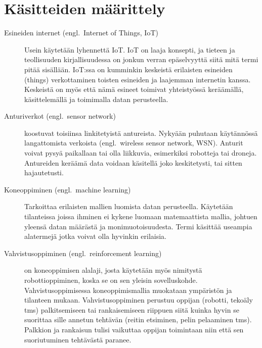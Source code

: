 \section{Käsitteiden määrittely}
\label{sec:terms}

\begin{description}

  \item [Esineiden internet (engl.\ Internet of Things, IoT)] Usein käytetään
    lyhennettä IoT. IoT on laaja konsepti, ja tieteen ja teollisuuden
    kirjallisuudessa on jonkun verran epäselvyyttä siitä mitä termi pitää
    sisällään. IoT:ssa on kumminkin keskeistä erilaisten esineiden (things)
    verkottaminen toisten esineiden ja laajemman internetin kanssa. Keskeistä
    on myös että nämä esineet toimivat yhteistyössä keräämällä, käsittelemällä
    ja toimimalla datan perusteella.~\parencite{Atzori2010a, Gubbi2013}

  \item [Anturiverkot (engl.\ sensor network)] koostuvat toisiinsa
    linkitetyistä antureista. Nykyään puhutaan käytännössä langattomista
    verkoista (engl.\ wireless sensor network, WSN).  Anturit voivat pysyä
    paikallaan tai olla liikkuvia, esimerkiksi robotteja tai droneja.
    Antureiden keräämä data voidaan käsitellä joko keskitetysti, tai sitten
    hajautetusti.~\parencite{Chong2003, Tubaishat2003}

  \item [Koneoppiminen (engl.\ machine learning)] Tarkoittaa erilaisten mallien
    luomista datan perusteella. Käytetään tilanteissa joissa ihminen ei kykene
    luomaan matemaattista mallia, johtuen yleensä datan määrästä ja
    monimuotoisuudesta.  Termi käsittää useampia alatermejä jotka voivat olla
    hyvinkin erilaisia.~\parencite{Grosan2011}

  \item [Vahvistusoppiminen (engl.\ reinforcement learning)] on koneoppimisen
    alalaji, josta käytetään myös nimitystä robottioppiminen, koska se on
    sen yleisin sovelluskohde.  Vahvistusoppimisessa koneoppimismallia
    muokataan ympäristön ja tilanteen mukaan. Vahvistusoppiminen perustuu
    oppijan (robotti, tekoäly tms) palkitsemiseen tai rankaisemiseen riippuen
    siitä kuinka hyvin se suorittaa sille annetun tehtävän (reitin etsiminen,
    pelin pelaaminen tms). Palkkion ja rankaisun tulisi vaikuttaa oppijan
    toimintaan niin että sen suoriutuminen tehtävästä
    paranee.~\parencite{Kaelbling1996}

\end{description}
